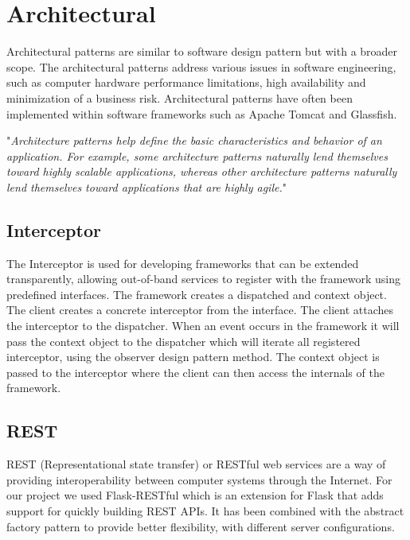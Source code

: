 \section{Architectural}
Architectural patterns are similar to software design pattern but with a broader scope. The architectural patterns address various issues in software engineering, such as computer hardware performance limitations, high availability and minimization of a business risk. Architectural patterns have often been implemented within software frameworks such as Apache Tomcat and Glassfish.

"\textit{Architecture patterns help define the basic characteristics and behavior of an application. For example, some architecture patterns naturally lend themselves toward highly scalable applications,
whereas other architecture patterns naturally lend themselves toward applications that are highly agile.}" \citep{patterns}

\subsection{Interceptor}
The Interceptor is used for developing frameworks that can be extended transparently, allowing out-of-band services to register with the framework using predefined interfaces. The framework creates  a dispatched and context object. The client creates a concrete interceptor from the interface. The client attaches the interceptor to the dispatcher. When an event occurs in the framework it will pass the context object to the dispatcher which will iterate all registered interceptor, using the observer design pattern method. The context object is passed to the interceptor where the client can then access the internals of the framework.

\subsection{REST}
REST (Representational state transfer) or RESTful web services are a way of providing interoperability between computer systems through the Internet. For our project we used Flask-RESTful which is an extension for Flask that adds support for quickly building REST APIs. It has been combined with the abstract factory pattern to provide better flexibility, with different server configurations.

